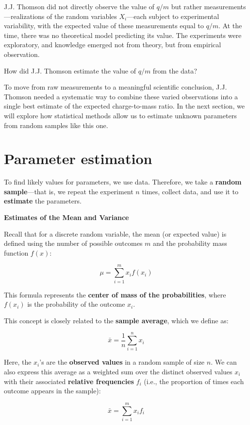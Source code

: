 \documentclass[
]{book}
\begin{document}
J.J. Thomson did not directly observe the value of \(q/m\) but rather measurements---realizations of the random variables \(X_i\)---each subject to experimental variability, with the expected value of these measurements equal to \(q/m\). At the time, there was no theoretical model predicting its value. The experiments were exploratory, and knowledge emerged not from theory, but from empirical observation.

How did J.J. Thomson estimate the value of \(q/m\) from the data?

To move from raw measurements to a meaningful scientific conclusion, J.J. Thomson needed a systematic way to combine these varied observations into a single best estimate of the expected charge-to-mass ratio. In the next section, we will explore how statistical methods allow us to estimate unknown parameters from random samples like this one.

\hypertarget{parameter-estimation}{%
\section{Parameter estimation}\label{parameter-estimation}}

To find likely values for parameters, we use data. Therefore, we take a \textbf{random sample}---that is, we repeat the experiment \(n\) times, collect data, and use it to \textbf{estimate} the parameters.

\textbf{Estimates of the Mean and Variance}

Recall that for a discrete random variable, the mean (or expected value) is defined using the number of possible outcomes \(m\) and the probability mass function \(f(x)\):

\[
\mu = \sum_{i=1}^m x_i f(x_i)
\]

This formula represents the \textbf{center of mass of the probabilities}, where \(f(x_i)\) is the probability of the outcome \(x_i\).

This concept is closely related to the \textbf{sample average}, which we define as:

\[
\bar{x} = \frac{1}{n} \sum_{i=1}^n x_i
\]

Here, the \(x_i\)'s are the \textbf{observed values} in a random sample of size \(n\). We can also express this average as a weighted sum over the distinct observed values \(x_i\) with their associated \textbf{relative frequencies} \(f_i\) (i.e., the proportion of times each outcome appears in the sample):

\[
\bar{x} = \sum_{i=1}^m x_i f_i
\]
\end{document}
